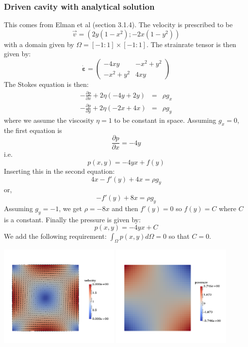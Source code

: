 \subsubsection{Driven cavity with analytical solution} \label{sec:ldc_anal}

This comes from Elman et al \cite{elsw}(section 3.1.4). The velocity is prescribed to be
\[
{\vec v}=(2y(1-x^2) ; -2x(1-y^2) )
\]
with a domain given by $\Omega=[-1:1]\times[-1:1]$.
The strainrate tensor is then given by:
\[
\dot{\bm \varepsilon}=
\left(
\begin{array}{cc}
-4xy & -x^2+y^2  \\
-x^2+y^2 & 4xy   
\end{array}
\right)
\]
The Stokes equation is then:
\begin{eqnarray}
-\frac{\partial p}{\partial x} + 2\eta ( -4y + 2y ) &=& \rho g_x \\
-\frac{\partial p}{\partial y} + 2\eta ( -2x + 4x ) &=& \rho g_y
\end{eqnarray}
where we assume the viscosity $\eta=1$ to be constant in space.
Assuming $g_x=0$, the first equation is
\[
\frac{\partial p}{\partial x} = - 4 y
\]
i.e.
\[
p(x,y)= -4  y x +f(y)
\]
Inserting this in the second equation:
\[
4  x - f'(y) + 4 x  = \rho g_y
\]
or,
\[
-f'(y) + 8  x  = \rho g_y
\]
Assuming $g_y=-1$, we get $\rho=-8x$ and then $f'(y)=0$ so $f(y)=C$ where $C$
is a constant.
Finally the pressure is given by:
\[
p(x,y)=-4  y x + C
\]
We add the following requirement: $\int_\Omega p(x,y) d\Omega =0$ so that $C=0$.

\begin{center}
\includegraphics[width=6cm]{images/benchmark_ldc_anal/velo}
\includegraphics[width=6cm]{images/benchmark_ldc_anal/press}
\end{center}


